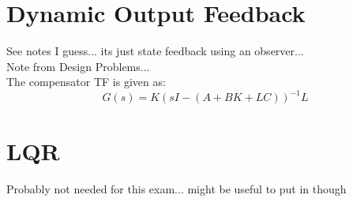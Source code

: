 \documentclass[]{article}
\begin{document}
\section*{Dynamic Output Feedback}
See notes I guess... its just state feedback using an observer...\\
Note from Design Problems...\\
The compensator TF is given as: 
\begin{displaymath}
	G(s) = K (sI - (A+BK+LC))^{-1} L
\end{displaymath}

\section*{LQR}
Probably not needed for this exam... might be useful to put in though
\end{document}
